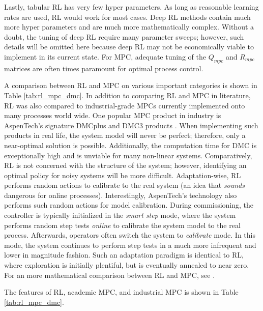 Lastly, tabular RL has very few hyper parameters. As long as reasonable learning rates are used, RL would work for most cases. Deep RL methods contain much more hyper parameters and are much more mathematically complex.  Without a doubt, the tuning of deep RL require many parameter sweeps; however, such details will be omitted here because deep RL may not be economically viable to implement in its current state. For MPC, adequate tuning of the $Q_{mpc}$ and $R_{mpc}$ matrices are often times paramount for optimal process control.  

A comparison between RL and MPC on various important categories is shown in Table \ref{tab:rl_mpc_dmc}. In addition to comparing RL and MPC in literature, RL was also compared to industrial-grade MPCs currently implemented onto many processes world wide. One popular MPC product in industry is AspenTech's signature DMCplus and DMC3 products \cite{aspen_dmcplus, aspen_dmc3}. When implementing such products in real life, the system model will never be perfect; therefore, only a near-optimal solution is possible. Additionally, the computation time for DMC is exceptionally high and is unviable for many non-linear systems. Comparatively, RL is not concerned with the structure of the system; however, identifying an optimal policy for noisy systems will be more difficult. Adaptation-wise, RL performs random actions to calibrate to the real system (an idea that \textit{sounds} dangerous for online processes). Interestingly, AspenTech's technology also performs such random actions for model calibration.  During commissioning, the controller is typically initialized in the \textit{smart step} mode, where the system  performs random step tests \textit{online} to calibrate the system model to the real process.  Afterwards, operators often switch the system to \textit{calibrate} mode.  In this mode, the system continues to perform step tests in a much more infrequent and lower in magnitude fashion. Such an adaptation paradigm is identical to RL, where exploration is initially plentiful, but is eventually annealed to near zero.  For an more mathematical comparison between RL and MPC, see \cite{rl_vs_mpc}.

The features of RL, academic MPC, and industrial MPC is shown in Table \ref{tab:rl_mpc_dmc}.

